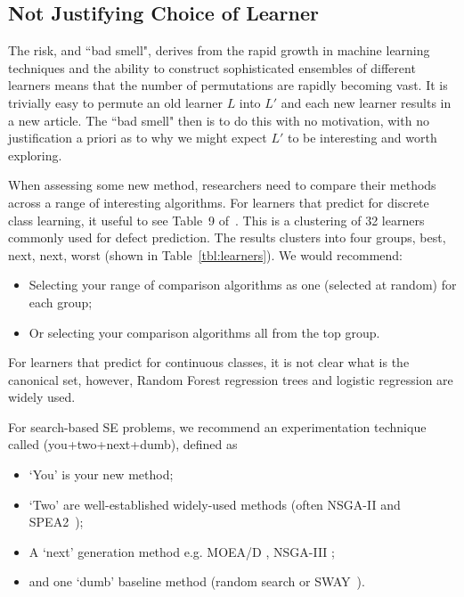 \documentclass[10pt]{elsarticle}
\begin{document}
 
\subsection{Not Justifying Choice of Learner} \label{ref:learner}

The risk, and ``bad smell", derives from the rapid growth in machine learning techniques and the ability to construct sophisticated ensembles of different learners means that the number of permutations are rapidly becoming vast.  It is trivially easy to permute an old learner $L$ into $L'$ and each new learner results in a new article.  The ``bad smell" then is to do this with no motivation, with no justification a priori as to why we might expect $L'$ to be interesting and worth exploring.

When assessing some new method, researchers need to compare their methods across a range of interesting algorithms.  For learners that predict for discrete class learning,  it useful to see Table~9 of~\cite{ghotra2015}. This is a clustering of 32 learners commonly used for defect prediction. The results clusters into four groups, best, next, next, worst
(shown in Table~\ref{tbl:learners}). We would recommend:
\begin{itemize}
\item
Selecting your range of comparison algorithms as one (selected at random) for each group;
\item 
Or selecting your comparison algorithms all from the top group.
\end{itemize}

For learners that predict for continuous classes, it is not clear what is the canonical set, however, Random Forest regression trees and logistic regression are widely used. 
 
For search-based SE problems, we recommend an experimentation technique called (you+two+next+dumb), defined as
\begin{itemize}
\item
`You' is your new method;
\item
`Two' are well-established widely-used methods (often NSGA-II and SPEA2~\cite{sayyad2013});
\item A `next' generation method e.g. MOEA/D \cite{zhang2007moea}, NSGA-III \cite{deb14};
\item and one `dumb' baseline method (random search or SWAY~\cite{chen2018}).
\end{itemize}

 

 
\end{document}
